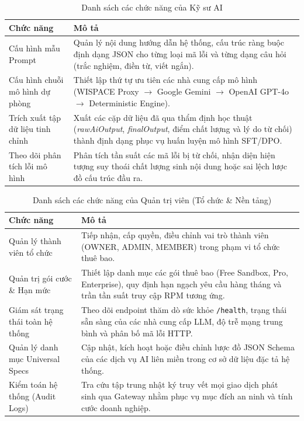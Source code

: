 \begin{table}[H]
\centering
\caption{Danh sách các chức năng của Kỹ sư AI}
\label{aihub:tab:func_ai_engineer}
\small
\begin{tabular}{|p{4.2cm}|p{\dimexpr\linewidth-4.2cm-4\tabcolsep-3\arrayrulewidth\relax}|}
\hline
\textbf{Chức năng} & \textbf{Mô tả} \\ \hline
Cấu hình mẫu Prompt & Quản lý nội dung hướng dẫn hệ thống, cấu trúc ràng buộc định dạng JSON cho từng loại mã lỗi và từng dạng câu hỏi (trắc nghiệm, điền từ, viết ngắn). \\ \hline
Cấu hình chuỗi mô hình dự phòng & Thiết lập thứ tự ưu tiên các nhà cung cấp mô hình (WISPACE Proxy $\rightarrow$ Google Gemini $\rightarrow$ OpenAI GPT-4o $\rightarrow$ Deterministic Engine). \\ \hline
Trích xuất tập dữ liệu tinh chỉnh & Xuất các cặp dữ liệu đã qua thẩm định học thuật (\textit{rawAiOutput}, \textit{finalOutput}, điểm chất lượng và lý do từ chối) thành định dạng phục vụ huấn luyện mô hình SFT/DPO. \\ \hline
Theo dõi phân tích lỗi mô hình & Phân tích tần suất các mã lỗi bị từ chối, nhận diện hiện tượng suy thoái chất lượng sinh nội dung hoặc sai lệch lược đồ cấu trúc đầu ra. \\ \hline
\end{tabular}
\end{table}

\begin{table}[H]
\centering
\caption{Danh sách các chức năng của Quản trị viên (Tổ chức \& Nền tảng)}
\label{aihub:tab:func_admin}
\small
\begin{tabular}{|p{4.2cm}|p{\dimexpr\linewidth-4.2cm-4\tabcolsep-3\arrayrulewidth\relax}|}
\hline
\textbf{Chức năng} & \textbf{Mô tả} \\ \hline
Quản lý thành viên tổ chức & Tiếp nhận, cấp quyền, điều chỉnh vai trò thành viên (OWNER, ADMIN, MEMBER) trong phạm vi tổ chức thuê bao. \\ \hline
Quản trị gói cước \& Hạn mức & Thiết lập danh mục các gói thuê bao (Free Sandbox, Pro, Enterprise), quy định hạn ngạch yêu cầu hàng tháng và trần tần suất truy cập RPM tương ứng. \\ \hline
Giám sát trạng thái toàn hệ thống & Theo dõi endpoint thăm dò sức khỏe \texttt{/health}, trạng thái sẵn sàng của các nhà cung cấp LLM, độ trễ mạng trung bình và phân bố mã lỗi HTTP. \\ \hline
Quản lý danh mục Universal Specs & Cập nhật, kích hoạt hoặc điều chỉnh lược đồ JSON Schema của các dịch vụ AI liên miền trong cơ sở dữ liệu đặc tả hệ thống. \\ \hline
Kiểm toán hệ thống (Audit Logs) & Tra cứu tập trung nhật ký truy vết mọi giao dịch phát sinh qua Gateway nhằm phục vụ mục đích an ninh và tính cước doanh nghiệp. \\ \hline
\end{tabular}
\end{table}
\newpage

